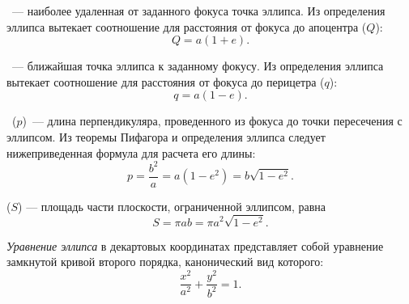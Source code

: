 ~--- наиболее удаленная 
от заданного фокуса точка эллипса. Из определения эллипса
вытекает соотношение для расстояния от фокуса до 
апоцентра ($Q$):\begin{equation}
Q = a (1 + e).
\end{equation}

~--- ближайшая 
точка эллипса к заданному фокусу. Из определения эллипса
вытекает соотношение для расстояния от фокуса до 
перицетра ($q$):\begin{equation}
q = a (1 - e).
\end{equation}

~($p$)~--- длина перпендикуляра,
проведенного из фокуса до точки пересечения с эллипсом.
Из теоремы Пифагора и определения эллипса следует 
нижеприведенная формула для расчета его длины:
\begin{equation}
p=\frac{b^2}{a}=a(1-e^2)=b\sqrt{1-e^2}.
\end{equation}

 ($S$) --- площадь части 
плоскости, ограниченной эллипсом, равна
\begin{equation}
S=\pi ab = \pi a^2 \sqrt{1-e^2}.
\end{equation}


{\itshape Уравнение эллипса} в декартовых координатах 
представляет собой уравнение замкнутой кривой второго 
порядка, канонический вид которого:
\begin{equation}
\frac{x^2}{a^2}+\frac{y^2}{b^2}=1.
\end{equation}

